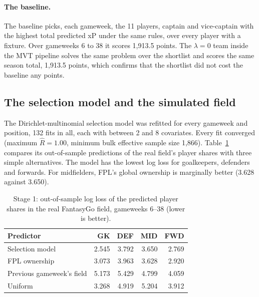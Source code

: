 \documentclass[12pt,oneside,a4paper]{book}
\theoremstyle{definition}
\theoremstyle{remark}
\begin{document}
	\paragraph{The baseline.} The baseline picks, each gameweek, the 11 players, captain and
	vice-captain with the highest total predicted xP under the same rules, over every player with a
	fixture. Over gameweeks 6 to 38 it scores 1{,}913.5 points. The $\lambda=0$ team inside the MVT
	pipeline solves the same problem over the shortlist and scores the same season total, 1{,}913.5
	points, which confirms that the shortlist did not cost the baseline any points.

	\subsection{The selection model and the simulated field}
	\label{sec:s1-field}

	The Dirichlet-multinomial selection model was refitted for every gameweek and position, 132
	fits in all, each with between 2 and 8 covariates. Every fit converged (maximum
	$\hat R = 1.00$, minimum bulk effective sample size 1{,}866). Table~\ref{tab:s1-oos} compares its
	out-of-sample predictions of the real field's player shares with three simple alternatives. The
	model has the lowest log loss for goalkeepers, defenders and forwards. For midfielders, FPL's
	global ownership is marginally better (3.628 against 3.650).

	\begin{table}[ht]
		\centering
		\caption{Stage 1: out-of-sample log loss of the predicted player shares in the real FantasyGo
			field, gameweeks 6--38 (lower is better).}
		\label{tab:s1-oos}
		\begin{tabular}{lrrrr}
			\toprule
			Predictor & GK & DEF & MID & FWD \\
			\midrule
			Selection model         & 2.545 & 3.792 & 3.650 & 2.769 \\
			FPL ownership           & 3.073 & 3.963 & 3.628 & 2.920 \\
			Previous gameweek's field & 5.173 & 5.429 & 4.799 & 4.059 \\
			Uniform                 & 3.268 & 4.919 & 5.204 & 3.912 \\
			\bottomrule
		\end{tabular}
	\end{table}
\end{document}
